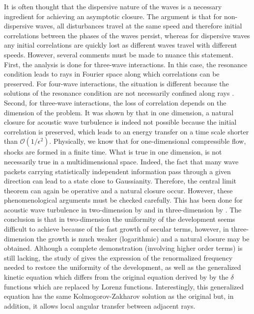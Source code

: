\documentclass{jpp}
\begin{document}
It is often thought that the dispersive nature of the waves is a necessary ingredient for achieving an asymptotic closure. The argument is that for non-dispersive waves, all disturbances travel at the same speed and therefore initial correlations between the phases of the waves persist, whereas for dispersive waves any initial correlations are quickly lost as different waves travel with different speeds. However, several comments must be made to nuance this statement. 
First, the analysis is done for three-wave interactions. In this case, the resonance condition leads to rays in Fourier space along which correlations can be preserved. For four-wave interactions, the situation is different because the solutions of the resonance condition are not necessarily confined along rays \citep{Nazarenko2011,Galtier2017,Hassaini2019}. 
Second, for three-wave interactions, the loss of correlation depends on the dimension of the problem. It was shown by \cite{Benney1966} that in one dimension, a natural closure for acoustic wave turbulence is indeed not possible because the initial correlation is preserved, which leads to an energy transfer on a time scale shorter than $\mathcal{O} (1/\epsilon^2)$. Physically, we know that for one-dimensional compressible flow, shocks are formed in a finite time. 
What is true in one  dimension, is not necessarily true in a multidimensional space. Indeed, the fact that many wave packets carrying statistically independent information pass through a given direction can lead to a state close to Gaussianity. Therefore, the central limit theorem can again be operative and a natural closure  occur. However, these phenomenological arguments must be checked carefully. This has been done for acoustic wave turbulence in two-dimension by \cite{Newell1971} and in three-dimension by \cite{Lvov1997}. The conclusion is that in two-dimension the uniformity of the development seems difficult to achieve because of the fast growth of secular terms, however, in three-dimension the growth is much weaker (logarithmic) and a natural closure may be obtained. Although a complete demonstration (involving higher order terms) is still lacking, the study of \cite{Lvov1997} gives the expression of the renormalized frequency needed to restore the uniformity of the development, as well as the generalized kinetic equation which differs from the original equation derived by \cite{Zakharov1970} by the $\delta$ functions which are replaced by Lorenz functions. Interestingly, this generalized equation has the same Kolmogorov-Zakharov solution as the original but, in addition, it allows local angular transfer between adjacent rays. 
\end{document}
